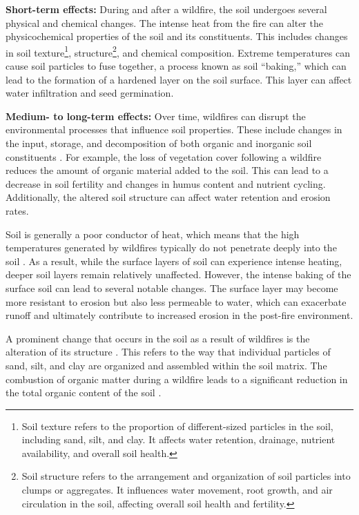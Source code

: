 \documentclass[
  12 pt,
]{Nemilov}
\begin{document}
\textbf{Short-term effects:} During and after a wildfire, the soil undergoes several physical and chemical changes. The intense heat from the fire can alter the physicochemical properties of the soil and its constituents. This includes changes in soil texture\footnote{Soil texture refers to the proportion of different-sized particles in the soil, including sand, silt, and clay. It affects water retention, drainage, nutrient availability, and overall soil health.}, structure\footnote{Soil structure refers to the arrangement and organization of soil particles into clumps or aggregates. It influences water movement, root growth, and air circulation in the soil, affecting overall soil health and fertility.}, and chemical composition. Extreme temperatures can cause soil particles to fuse together, a process known as soil ``baking,'' which can lead to the formation of a hardened layer on the soil surface. This layer can affect water infiltration and seed germination.

\textbf{Medium- to long-term effects:} Over time, wildfires can disrupt the environmental processes that influence soil properties. These include changes in the input, storage, and decomposition of both organic and inorganic soil constituents \citep{pellegrini2022fire}. For example, the loss of vegetation cover following a wildfire reduces the amount of organic material added to the soil. This can lead to a decrease in soil fertility and changes in humus content and nutrient cycling. Additionally, the altered soil structure can affect water retention and erosion rates.

Soil is generally a poor conductor of heat, which means that the high temperatures generated by wildfires typically do not penetrate deeply into the soil \citep{ice2004effects}. As a result, while the surface layers of soil can experience intense heating, deeper soil layers remain relatively unaffected. However, the intense baking of the surface soil can lead to several notable changes. The surface layer may become more resistant to erosion but also less permeable to water, which can exacerbate runoff and ultimately contribute to increased erosion in the post-fire environment.

A prominent change that occurs in the soil as a result of wildfires is the alteration of its structure \citep{chief2012changes, vsimansky2015changes}. This refers to the way that individual particles of sand, silt, and clay are organized and assembled within the soil matrix. The combustion of organic matter during a wildfire leads to a significant reduction in the total organic content of the soil \citep{certini2011wildfire, fernandez1997organic}.
\end{document}
